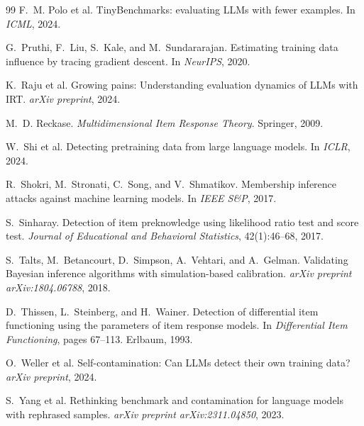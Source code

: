 \documentclass[11pt,a4paper]{article}
\begin{document}
\begin{thebibliography}{99}
F.~M. Polo et al.
\newblock TinyBenchmarks: evaluating LLMs with fewer examples.
\newblock In \emph{ICML}, 2024.

G.~Pruthi, F.~Liu, S.~Kale, and M.~Sundararajan.
\newblock Estimating training data influence by tracing gradient descent.
\newblock In \emph{NeurIPS}, 2020.

K.~Raju et al.
\newblock Growing pains: Understanding evaluation dynamics of LLMs with IRT.
\newblock \emph{arXiv preprint}, 2024.

M.~D. Reckase.
\newblock \emph{Multidimensional Item Response Theory}.
\newblock Springer, 2009.

W.~Shi et al.
\newblock Detecting pretraining data from large language models.
\newblock In \emph{ICLR}, 2024.

R.~Shokri, M.~Stronati, C.~Song, and V.~Shmatikov.
\newblock Membership inference attacks against machine learning models.
\newblock In \emph{IEEE S\&P}, 2017.

S.~Sinharay.
\newblock Detection of item preknowledge using likelihood ratio test and score test.
\newblock \emph{Journal of Educational and Behavioral Statistics}, 42(1):46--68, 2017.

S.~Talts, M.~Betancourt, D.~Simpson, A.~Vehtari, and A.~Gelman.
\newblock Validating Bayesian inference algorithms with simulation-based calibration.
\newblock \emph{arXiv preprint arXiv:1804.06788}, 2018.

D.~Thissen, L.~Steinberg, and H.~Wainer.
\newblock Detection of differential item functioning using the parameters of item response models.
\newblock In \emph{Differential Item Functioning}, pages 67--113. Erlbaum, 1993.

O.~Weller et al.
\newblock Self-contamination: Can LLMs detect their own training data?
\newblock \emph{arXiv preprint}, 2024.

S.~Yang et al.
\newblock Rethinking benchmark and contamination for language models with rephrased samples.
\newblock \emph{arXiv preprint arXiv:2311.04850}, 2023.


\end{thebibliography}
\end{document}
